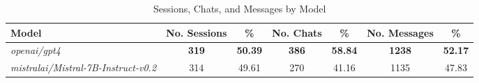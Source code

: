 
\begin{table}[H]
\centering
\scriptsize
\begin{tabular}{@{}lcccccc@{}}
\toprule
Model & No. Sessions & \% & No. Chats & \% & No. Messages & \% \\
\midrule
\textit{openai/gpt4} & \textbf{319} & \textbf{50.39} & \textbf{386} & \textbf{58.84} & \textbf{1238} & \textbf{52.17} \\
\textit{mistralai/Mistral-7B-Instruct-v0.2} & 314 & 49.61 & 270 & 41.16 & 1135 & 47.83 \\

\bottomrule
\end{tabular}
\caption{Sessions, Chats, and Messages by Model}
\label{tab:sessions_chats_and_messages_by_model}
\end{table}
